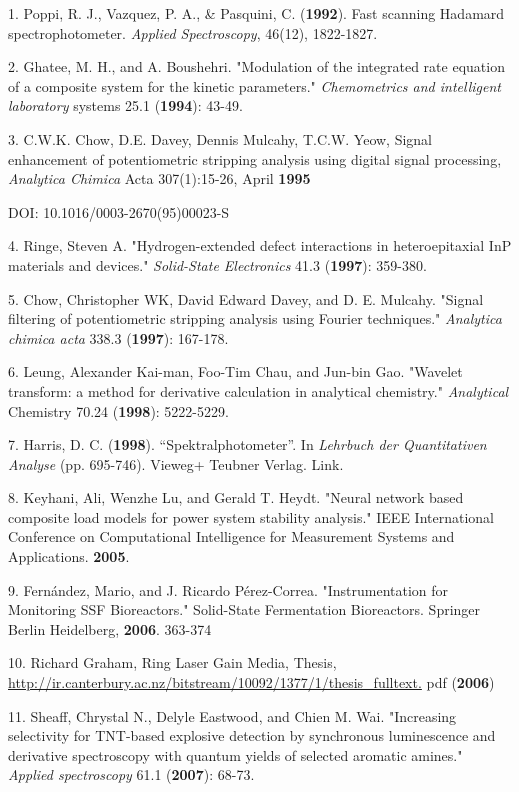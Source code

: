 1. Poppi, R. J., Vazquez, P. A., \& Pasquini, C. (\textbf{1992}). Fast scanning Hadamard spectrophotometer. \textit{Applied Spectroscopy}, 46(12), 1822-1827.

2. Ghatee, M. H., and A. Boushehri. "Modulation of the integrated rate equation of a composite system for the kinetic parameters." \textit{Chemometrics and intelligent laboratory} systems 25.1 (\textbf{1994}): 43-49.

3. C.W.K. Chow, D.E. Davey, Dennis Mulcahy, T.C.W. Yeow, Signal enhancement of potentiometric stripping analysis using digital signal processing, \textit{Analytica Chimica} Acta 307(1):15-26, April \textbf{1995}

DOI: 10.1016/0003-2670(95)00023-S

4. Ringe, Steven A. "Hydrogen-extended defect interactions in heteroepitaxial InP materials and devices." \textit{Solid-State Electronics} 41.3 (\textbf{1997}): 359-380.

5. Chow, Christopher WK, David Edward Davey, and D. E. Mulcahy. "Signal filtering of potentiometric stripping analysis using Fourier techniques." \textit{Analytica chimica acta} 338.3 (\textbf{1997}): 167-178.

6. Leung, Alexander Kai-man, Foo-Tim Chau, and Jun-bin Gao. "Wavelet transform: a method for derivative calculation in analytical chemistry." \textit{Analytical} Chemistry 70.24 (\textbf{1998}): 5222-5229.

7. Harris, D. C. (\textbf{1998}). ``Spektralphotometer''. In \textit{Lehrbuch der Quantitativen Analyse} (pp. 695-746). Vieweg+ Teubner Verlag. Link.

8. Keyhani, Ali, Wenzhe Lu, and Gerald T. Heydt. "Neural network based composite load models for power system stability analysis." IEEE International Conference on Computational Intelligence for Measurement Systems and Applications. \textbf{2005}.

9. Fern\'{a}ndez, Mario, and J. Ricardo P\'{e}rez-Correa. "Instrumentation for Monitoring SSF Bioreactors." Solid-State Fermentation Bioreactors. Springer Berlin Heidelberg, \textbf{2006}. 363-374

10. Richard Graham, Ring Laser Gain Media, Thesis, \url{http://ir.canterbury.ac.nz/bitstream/10092/1377/1/thesis_fulltext.} pdf (\textbf{2006})

11. Sheaff, Chrystal N., Delyle Eastwood, and Chien M. Wai. "Increasing selectivity for TNT-based explosive detection by synchronous luminescence and derivative spectroscopy with quantum yields of selected aromatic amines." \textit{Applied spectroscopy} 61.1 (\textbf{2007}): 68-73.

